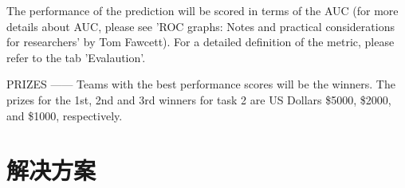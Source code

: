\documentclass[10pt,a4paper]{ctexbook}
\begin{document}
The performance of the prediction will be scored in terms of the AUC (for more details about AUC, please see 'ROC graphs: Notes and practical considerations for researchers' by Tom Fawcett). For a detailed definition of the metric, please refer to the tab 'Evalaution'.

PRIZES
------
Teams with the best performance scores will be the winners. The prizes for the 1st, 2nd and 3rd winners for task 2 are US Dollars \$5000, \$2000, and \$1000, respectively.


\section{解决方案}



\ifx\mlbook\undefined
    
\end{document}
